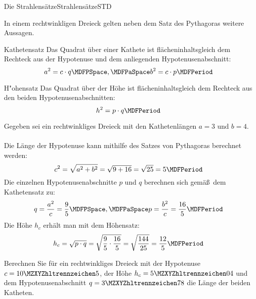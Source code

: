 \begin{MXContent}{Die Strahlens\"atze}{Strahlens\"atze}{STD}
\begin{MInfo}
\end{MInfo}


\begin{MCOSHZusatz}
In einem rechtwinkligen Dreieck gelten neben dem Satz des Pythagoras weitere 
Aussagen.
\begin{MXInfo}{Kathetensatz}
Das Quadrat \"uber einer Kathete ist fl\"acheninhaltsgleich dem Rechteck aus 
der Hypotenuse und dem anliegenden Hypotenusenabschnitt: 
\[a^2 = c\cdot q \MDFPSpace, \MDFPaSpace b^2=c\cdot p \MDFPeriod\]
\end{MXInfo}

\begin{MXInfo}{H"ohensatz}
Das Quadrat \"uber der H\"ohe ist fl\"acheninhaltsgleich dem Rechteck aus 
den beiden Hypotenusenabschnitten: 
\[h^2 = p\cdot q \MDFPeriod\]	
\end{MXInfo}

\end{MCOSHZusatz}

\begin{MExample}
Gegeben sei ein rechtwinkliges Dreieck mit den Kathetenl\"angen $a=3$ und $b=4$.\\
\ \\
Die L\"ange der Hypotenuse kann mithilfe des Satzes von Pythagoras berechnet werden:
\[c^2=\sqrt{a^2 + b^2}=\sqrt{9 + 16}=\sqrt{25}=5 \MDFPeriod\]
Die einzelnen Hypotenusenabschnitte $p$ und $q$ berechnen sich gem\"a\ss\ dem Kathetensatz zu:
\[q=\frac{a^2}{c}=\frac{9}{5} \MDFPSpace, \MDFPaSpace p=\frac{b^2}{c}=\frac{16}{5} \MDFPeriod\]
Die H\"ohe $h_c$ erh\"alt man mit dem H\"ohensatz:
\[h_c=\sqrt{p\cdot q}=\sqrt{\frac{9}{5}\cdot\frac{16}{5}}=\sqrt{\frac{144}{25}}=\frac{12}{5} \MDFPeriod\]
\end{MExample}

\begin{MExercise}
Berechnen Sie f\"ur ein rechtwinkliges Dreieck mit der Hypotenuse $c=\MZahl{10}{5}$, der H\"ohe $h_c=\MZahl{5}{04}$ und dem Hypotenusenabschnitt $q=\MZahl{3}{78}$ die L\"ange der beiden Katheten.


\end{MExercise}
\end{MXContent}
